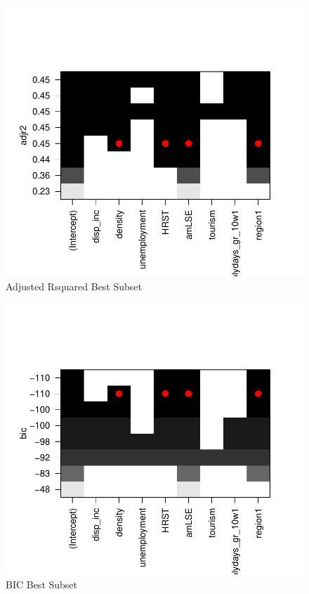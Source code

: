 \documentclass[
  letterpaper,
  DIV=11,
  numbers=noendperiod,
  abstract]{scrartcl}
\begin{document}
\begin{figure}[H]

{\centering \includegraphics[width=1\textwidth,height=\textheight]{report_files/figure-pdf/best subset-1.pdf}

}

\caption{Adjusted Rsquared Best Subset}

\end{figure}%

\begin{figure}[H]

{\centering \includegraphics[width=1\textwidth,height=\textheight]{report_files/figure-pdf/bic-1.pdf}

}

\caption{BIC Best Subset}

\end{figure}%
\end{document}
